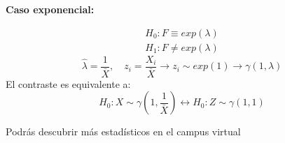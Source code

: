\textbf{Caso exponencial:}

\[
\begin{matrix}
    H_0:F \equiv exp(\lambda) \\
    H_1:F \neq exp(\lambda)
\end{matrix}
\]
\[
    \widehat{\lambda}=\frac{1}{\bar{X}}, \quad z_i
    =\frac{X_i}{\bar{X}} \to z_i \sim exp(1) \longrightarrow\gamma(1,\lambda)
\]
El contraste es equivalente a:
\[
    H_0: X \sim \gamma\left(1,\frac{1}{\bar{X}}\right) \longleftrightarrow H_0:Z \sim \gamma(1,1)
\]

\vspace*{5mm}

\noindent Podrás descubrir más estadísticos en el campus virtual

\newpage